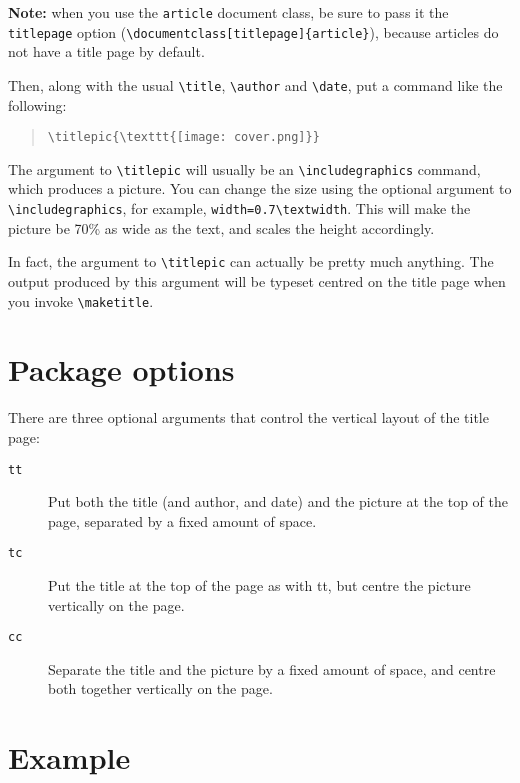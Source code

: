 \documentclass[titlepage]{article}
\begin{document}
\textbf{Note:} when you use the \verb$article$ document class, be sure to pass it the \verb$titlepage$ option (\verb$\documentclass[titlepage]{article}$), because articles do not have a title page by default.

Then, along with the usual \verb$\title$, \verb$\author$ and \verb$\date$, put a command like the following:

\begin{quote}
	\verb$\titlepic{\texttt{[image: cover.png]}}$
\end{quote}

The argument to \verb$\titlepic$ will usually be an \verb$\includegraphics$ command, which produces a picture. You can change the size using the optional argument to \verb$\includegraphics$, for example, \verb$width=0.7\textwidth$. This will make the picture be 70\% as wide as the text, and scales the height accordingly.

In fact, the argument to \verb$\titlepic$ can actually be pretty much anything. The output produced by this argument will be typeset centred on the title page when you invoke \verb$\maketitle$.

\section{Package options}

There are three optional arguments that control the vertical layout of the title page:

\begin{description}
\item[\tt{tt}]
	Put both the title (and author, and date) and the picture at the top of the page, separated by a fixed amount of space.
\item[\tt{tc}]
	Put the title at the top of the page as with tt, but centre the picture vertically on the page.
\item[\tt{cc}]
	Separate the title and the picture by a fixed amount of space, and centre both together vertically on the page.
\end{description}

\section{Example}
\end{document}
